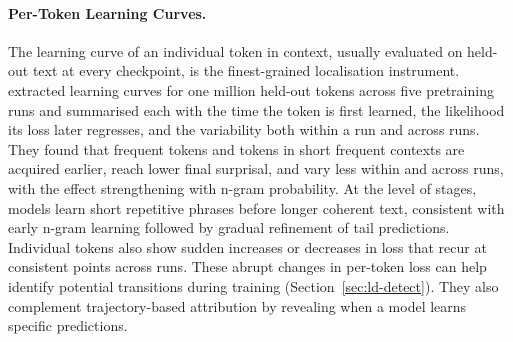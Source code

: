 \paragraph{Per-Token Learning Curves.} The learning curve of an individual token in context, usually evaluated on held-out text at every checkpoint, is the finest-grained localisation instrument.  extracted learning curves for one million held-out tokens across five pretraining runs and summarised each with the time the token is first learned, the likelihood its loss later regresses, and the variability both within a run and across runs. They found that frequent tokens and tokens in short frequent contexts are acquired earlier, reach lower final surprisal, and vary less within and across runs, with the effect strengthening with n-gram probability. At the level of stages, models learn short repetitive phrases before longer coherent text, consistent with early n-gram learning followed by gradual refinement of tail predictions. Individual tokens also show sudden increases or decreases in loss that recur at consistent points across runs. These abrupt changes in per-token loss can help identify potential transitions during training (Section~\ref{sec:ld-detect}). They also complement trajectory-based attribution by revealing when a model learns specific predictions.

